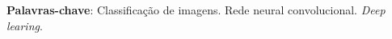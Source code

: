 \begin{resumo}[RESUMO]
\begin{SingleSpacing}
\textbf{Palavras-chave}: Classificação de imagens. Rede neural convolucional. \textit{Deep learing}.

\end{SingleSpacing}
\end{resumo}


